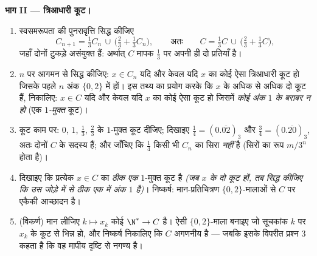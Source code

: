 \begin{problem}[{सप्ताहांत समस्या --- कैंटर का मध्य-तिहाई \omterm{def:b1:logic:sets}{समुच्चय}: लंबाई शून्य, अगणनीय, पूर्ण,
और $C + C =
\intcc{0}{2}$}]
\medskip \noindent\textbf{भाग II --- त्रिआधारी कूट।}
\begin{enumerate}[resume]
  \item स्वसमरूपता की पुनरावृत्ति सिद्ध कीजिए
        \[
        C_{n+1} = \tfrac13 C_n \,\cup\,
        \bigl(\tfrac23 + \tfrac13 C_n\bigr),
        \qquad\text{अतः}\qquad
        C = \tfrac13 C \,\cup\, \bigl(\tfrac23 + \tfrac13
        C\bigr),
        \]
        जहाँ दोनों टुकड़े असंयुक्त हैं: अर्थात् $C$ मापक $\frac13$ पर अपनी
        ही दो प्रतियाँ है।
  \item $n$ पर आगमन से सिद्ध कीजिए: $x \in C_n$ यदि और केवल यदि $x$ का कोई
  ऐसा त्रिआधारी कूट हो जिसके पहले $n$ अंक $\{0, 2\}$ में हों। इस तथ्य का
  प्रयोग करके कि $x$ के अधिक से अधिक दो कूट हैं, निकालिए: $x \in C$ यदि और
  केवल यदि $x$ का कोई ऐसा कूट हो जिसमें \emph{कोई अंक $1$ के बराबर न हो} (एक
  \emph{$1$-मुक्त} कूट)।
  \item कूट काम पर: $0$, $1$, $\frac13$, $\frac23$ के $1$-मुक्त कूट दीजिए;
  दिखाइए $\frac14 = (0.\overline{02})_3$ और $\frac34 = (0.\overline{20})_3$,
  अतः दोनों $C$ के सदस्य हैं; और जाँचिए कि $\frac14$ किसी भी $C_n$ का सिरा
  \emph{नहीं} है (सिरों का रूप $m/3^n$ होता है)।
  \item दिखाइए कि प्रत्येक $x \in C$ का \emph{ठीक एक} $1$-मुक्त कूट है
  \emph{(जब $x$ के दो कूट हों, तब सिद्ध कीजिए कि उस जोड़े में से ठीक एक में
  अंक $1$ है)}। निष्कर्ष: मान-प्रतिचित्रण $\{0,2\}$-मालाओं से $C$ पर एकैकी
  आच्छादन है।
  \item (विकर्ण) मान लीजिए $k \mapsto x_k$ कोई  $\N^* \to C$ है।
  ऐसी $\{0, 2\}$-माला बनाइए जो सूचकांक $k$ पर $x_k$ के कूट से भिन्न हो, और
  निष्कर्ष निकालिए कि $C$ अगणनीय है --- जबकि इसके विपरीत प्रश्न 3 कहता है कि
  वह मापीय दृष्टि से नगण्य है।
\end{enumerate}


\end{problem}
